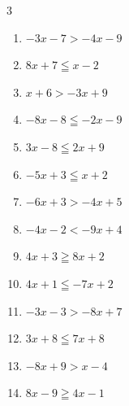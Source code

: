 \begin{multicols}{3}
\begin{enumerate}
  \item $-3x-7>-4x-9$

        \phantom{$\displaystyle x>-2$}

  \item $8x+7\leqq x-2$


  \item $x+6>-3x+9$


  \item $-8x-8\leqq -2x-9$


  \item $3x-8\leqq 2x+9$

        \phantom{$\displaystyle x\leqq 17$}

  \item $-5x+3\leqq x+2$


  \item $-6x+3>-4x+5$

        \phantom{$\displaystyle x<-1$}

  \item $-4x-2<-9x+4$


  \item $4x+3\geqq 8x+2$


  \item $4x+1\leqq -7x+2$


  \item $-3x-3>-8x+7$

        \phantom{$\displaystyle x>2$}

  \item $3x+8\leqq 7x+8$

        \phantom{$\displaystyle x\geqq 0$}

  \item $-8x+9>x-4$


  \item $8x-9\geqq 4x-1$


\end{enumerate}
\end{multicols}
